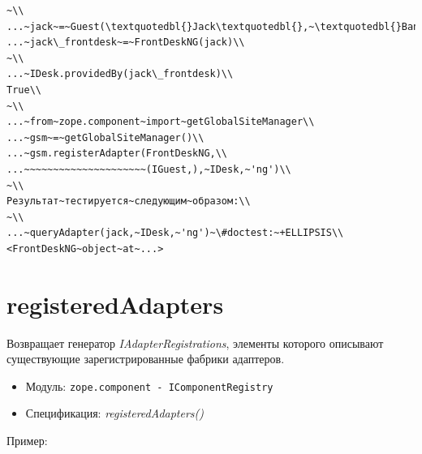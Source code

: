 \documentclass[a4paper,openany,twoside,draft]{book}
\providecommand*{\DUroletitlereference}[1]{\textsl{#1}}
\begin{document}
\begin{verbatim}
~\\
...~jack~=~Guest(\textquotedbl{}Jack\textquotedbl{},~\textquotedbl{}Bangalore\textquotedbl{})\\
...~jack\_frontdesk~=~FrontDeskNG(jack)\\
~\\
...~IDesk.providedBy(jack\_frontdesk)\\
True\\
~\\
...~from~zope.component~import~getGlobalSiteManager\\
...~gsm~=~getGlobalSiteManager()\\
...~gsm.registerAdapter(FrontDeskNG,\\
...~~~~~~~~~~~~~~~~~~~~~(IGuest,),~IDesk,~'ng')\\
~\\
Результат~тестируется~следующим~образом:\\
~\\
...~queryAdapter(jack,~IDesk,~'ng')~\#doctest:~+ELLIPSIS\\
<FrontDeskNG~object~at~...>
\end{verbatim}


\section*{registeredAdapters%
  \label{registeredadapters}%
}

Возвращает генератор \DUroletitlereference{IAdapterRegistrations}, элементы которого
описывают существующие зарегистрированные фабрики адаптеров.

\begin{itemize}

\item Модуль: \texttt{zope.component - IComponentRegistry}

\item Спецификация: \DUroletitlereference{registeredAdapters()}

\end{itemize}

Пример:
\end{document}
